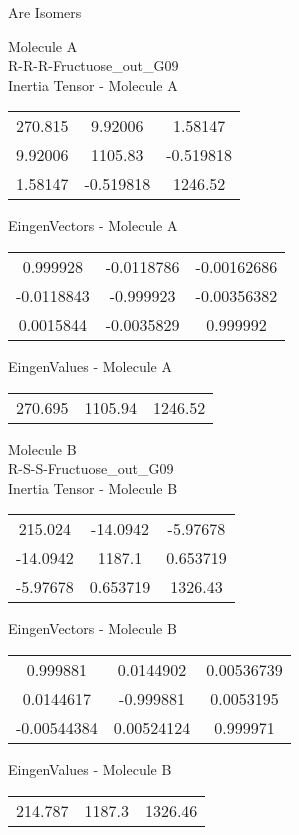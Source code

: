 \begin{center}
\vtab
\vtab
\textcolor{NavyBlue}{\Large Are Isomers}
\end{center}
\newpage
\begin{multicols}{2}
\begin{center}
Molecule A \\ 
R-R-R-Fructuose\_out\_G09
\\
Inertia Tensor - Molecule A \\
\vtab
\begin{tabular}{|c c c|}
270.815	 & 	9.92006	 & 	1.58147	 \\
9.92006	 & 	1105.83	 & 	-0.519818	 \\
1.58147	 & 	-0.519818	 & 	1246.52
\end{tabular}

\vtab
 EingenVectors - Molecule A     \\
\vtab
\begin{tabular}{|c c c|}
0.999928	 & 	-0.0118786	 & 	-0.00162686	 \\
-0.0118843	 & 	-0.999923	 & 	-0.00356382	 \\
0.0015844	 & 	-0.0035829	 & 	0.999992
\end{tabular}

\vtab
 EingenValues - Molecule A     \\
\vtab
\begin{tabular}{|c c c|}
270.695	 & 	1105.94	 & 	1246.52
\end{tabular}
\columnbreak

Molecule B \\ 
R-S-S-Fructuose\_out\_G09
\\
Inertia Tensor - Molecule B \\
\vtab
\begin{tabular}{|c c c|}
215.024	 & 	-14.0942	 & 	-5.97678	 \\
-14.0942	 & 	1187.1	 & 	0.653719	 \\
-5.97678	 & 	0.653719	 & 	1326.43
\end{tabular}

\vtab
 EingenVectors - Molecule B     \\
\vtab
\begin{tabular}{|c c c|}
0.999881	 & 	0.0144902	 & 	0.00536739	 \\
0.0144617	 & 	-0.999881	 & 	0.0053195	 \\
-0.00544384	 & 	0.00524124	 & 	0.999971
\end{tabular}

\vtab
 EingenValues - Molecule B     \\
\vtab
\begin{tabular}{|c c c|}
214.787	 & 	1187.3	 & 	1326.46
\end{tabular}

\end{center}
\end{multicols}
